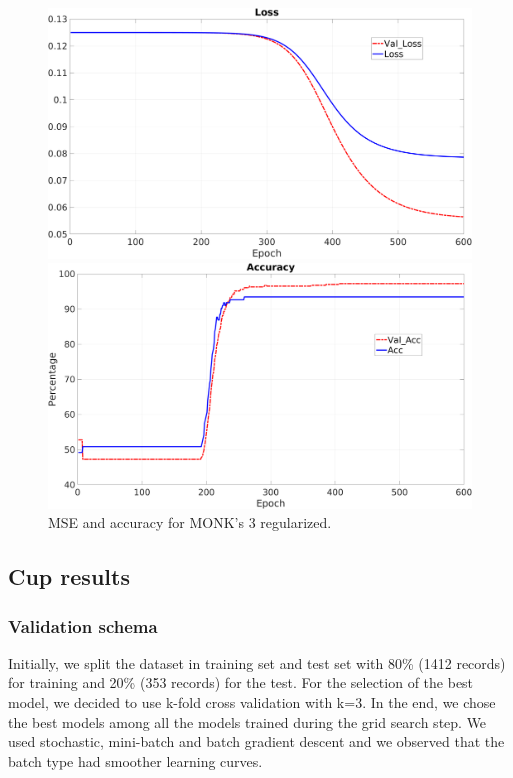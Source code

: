 \begin{figure}[H]
    \centering
    \begin{minipage}[t]{0.5\linewidth}
        \includegraphics[width=\linewidth]{img/Monk3_loss_Reg.png}
    \end{minipage}%
    \begin{minipage}[t]{0.5\linewidth}
        \includegraphics[width=\linewidth]{img/Monk3_accuracy_Reg.png}
    \end{minipage}
    \caption{MSE and accuracy for MONK’s 3 regularized.}
    \label{fig:m3r}
\end{figure}



\subsection{Cup results}

\subsubsection{Validation schema}
Initially, we split the dataset in training set and test set with 80\% (1412 records) for training and 20\% (353 records) for the test. For the selection of the best model, we decided to use k-fold cross validation with k=3. In the end, we chose the best models among all the models trained during the grid search step. We used stochastic, mini-batch and batch gradient descent and we observed that the batch type had smoother learning curves.

